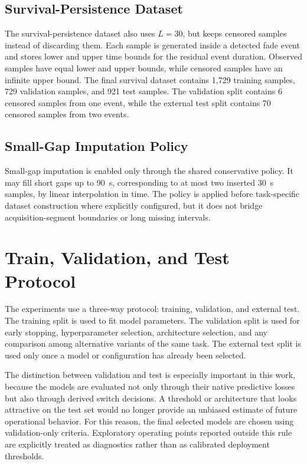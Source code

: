 \subsection{Survival-Persistence Dataset}

The survival-persistence dataset also uses \(L=30\), but keeps censored samples
instead of discarding them. Each sample is generated inside a detected fade
event and stores lower and upper time bounds for the residual event duration.
Observed samples have equal lower and upper bounds, while censored samples have
an infinite upper bound. The final survival dataset contains 1,729 training
samples, 729 validation samples, and 921 test samples. The validation split
contains 6 censored samples from one event, while the external test split
contains 70 censored samples from two events.

\subsection{Small-Gap Imputation Policy}

Small-gap imputation is enabled only through the shared conservative policy.
It may fill short gaps up to \SI{90}{s}, corresponding to at most two inserted
\SI{30}{s} samples, by linear interpolation in time. The policy is applied
before task-specific dataset construction where explicitly configured, but it
does not bridge acquisition-segment boundaries or long missing intervals.

\section{Train, Validation, and Test Protocol}
\label{sec:train-validation-test-protocol}

The experiments use a three-way protocol: training, validation, and external
test. The training split is used to fit model parameters. The validation split is
used for early stopping, hyperparameter selection, architecture selection, and
any comparison among alternative variants of the same task. The external test
split is used only once a model or configuration has already been selected.

The distinction between validation and test is especially important in this
work, because the models are evaluated not only through their native predictive
losses but also through derived switch decisions. A threshold or architecture
that looks attractive on the test set would no longer provide an unbiased
estimate of future operational behavior. For this reason, the final selected
models are chosen using validation-only criteria. Exploratory operating points
reported outside this rule are explicitly treated as diagnostics rather than as
calibrated deployment thresholds.


